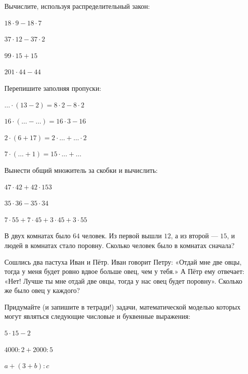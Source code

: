 \begin{listofex}
	\item Вычислите, используя распределительный закон:
	\begin{enumcols}[itemcolumns=2]
		\item \( 18\cdot9-18\cdot7 \)
		\item \( 37\cdot12-37\cdot2 \)
		\item \( 99\cdot15+15 \)
		\item \( 201\cdot44-44 \)
	\end{enumcols}
	\item Перепишите заполняя пропуски:
	\begin{enumcols}[itemcolumns=2]
		\item \( {\dots}\cdot(13-2)=8\cdot2-8\cdot2 \)
		\item \( 16\cdot({\dots}-\dots)=16\cdot3-16 \)
		\item \( 2\cdot(6+17)=2\cdot{\dots}+{\dots}\cdot2 \)
		\item \( 7\cdot({\dots}+1)=15\cdot{\dots}+{\dots} \)
	\end{enumcols}
	\item Вынести общий множитель за скобки и вычислить:
	\begin{enumcols}[itemcolumns=3]
		\item \( 47\cdot42+42\cdot153 \)
		\item \( 35\cdot36-35\cdot34 \)
		\item \( 7\cdot55+7\cdot45+3\cdot45+3\cdot55 \)
	\end{enumcols}
	\item В двух комнатах было \( 64 \) человек. Из первой вышли \( 12 \), а из второй --- \( 15 \), и людей в комнатах стало поровну. Сколько человек было в комнатах сначала?
	\item Сошлись два пастуха Иван и Пётр. Иван говорит Петру: «Отдай мне две овцы,
	тогда у меня будет ровно вдвое больше овец, чем у тебя.» А Пётр ему отвечает: «Нет!
	Лучше ты мне отдай две овцы, тогда у нас овец будет поровну». Сколько же было овец у
	каждого?
	\item Придумайте (и запишите в тетради!) задачи, математической моделью которых могут
	являться следующие числовые и буквенные выражения:
	\begin{enumcols}[itemcolumns=3]
		\item \( 5\cdot15-2 \)
		\item \( 4000:2+2000:5 \)
		\item \( a+(3+b):c \)
	\end{enumcols}

\end{listofex}
